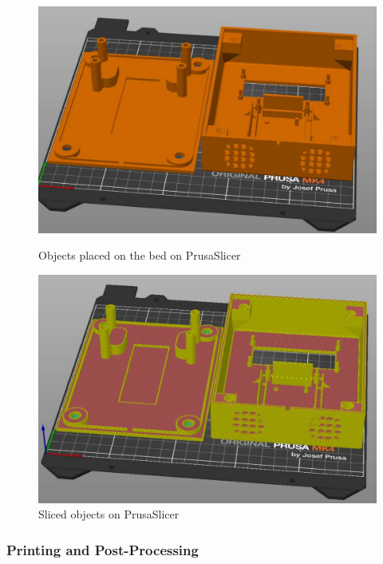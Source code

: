 \begin{figure}[h]
    \centering
    \begin{minipage}[b]{0.47\textwidth}
        \centering
        \includegraphics[width=1\textwidth]{Imagenes/Vectorial/prusaslicer_objects.pdf}
        \caption{Objects placed on the bed on PrusaSlicer}
        \label{fig:prusaslicer_objects}
    \end{minipage}
    \hfill
    \begin{minipage}[b]{0.47\textwidth}
        \centering
        \includegraphics[width=1\textwidth]{Imagenes/Vectorial/prusaslicer_sliced.pdf}
        \caption{Sliced objects on PrusaSlicer}
        \label{fig:prusaslicer_sliced}
    \end{minipage}
\end{figure}

\subsubsection{Printing and Post-Processing}

